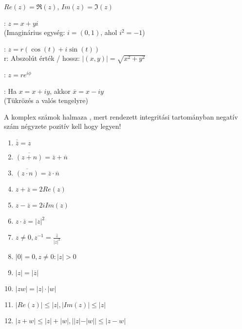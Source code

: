 \begin{frame}
\begin{tcolorbox}[title={Alakok}]
$Re(z) = {\Re}(z)$, $Im(z) = {\Im}(z)$\\
\mmedskip

: $z = x + yi$\\
(Imaginárius egység: $i = (0, 1)$, ahol $i^2 = -1$)\\
\mmedskip

: $z = r({\cos}(t) + i{\sin}(t))$\\
r: Abszolút érték / hossz: $|(x, y)| = \sqrt{x^2 + y^2}$\\
\mmedskip

: $z = re^{i{\phi}}$\\
\mmedskip

: Ha $x = x + iy$, akkor $\overline{x} = x - iy$\\
(Tükrözés a valós tengelyre)\\
\mmedskip

A komplex számok halmaza , mert rendezett integritási tartományban negatív szám négyzete pozitív kell hogy legyen!
\end{tcolorbox}

\begin{tcolorbox}[title={Ész}]
\begin{enumerate}
\item $\overline{\overline{z}} = z$
\item $\overline{(z + n)} = \overline{z} + \overline{n}$
\item $\overline{(z \cdot n)} = \overline{z} \cdot \overline{n}$
\item $z + \overline{z} = 2Re(z)$
\item $z - \overline{z} = 2iIm(z)$
\item $z \cdot \overline{z} = |z|^2$
\item $z \neq 0, z^{-1} = \frac{\overline{z}}{|z|^2}$
\item $|0| = 0, z \neq 0 : |z| > 0$
\item $|z| = |\overline{z}|$
\item $|zw| = |z| \cdot |w|$
\item $|Re(z)| \leq |z|, |Im(z)| \leq |z|$
\item $|z + w| \leq |z| + |w|, ||z| - |w|| \leq |z - w|$
\end{enumerate}
\end{tcolorbox}
\end{frame}

